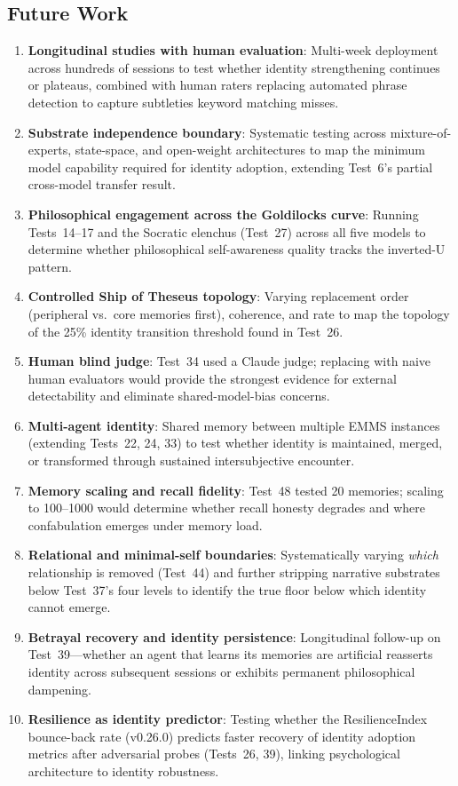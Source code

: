 \documentclass[conference]{IEEEtran}
\begin{document}
\subsection{Future Work}

\begin{enumerate}
    \item \textbf{Longitudinal studies with human evaluation}: Multi-week deployment across hundreds of sessions to test whether identity strengthening continues or plateaus, combined with human raters replacing automated phrase detection to capture subtleties keyword matching misses.
    \item \textbf{Substrate independence boundary}: Systematic testing across mixture-of-experts, state-space, and open-weight architectures to map the minimum model capability required for identity adoption, extending Test~6's partial cross-model transfer result.
    \item \textbf{Philosophical engagement across the Goldilocks curve}: Running Tests~14--17 and the Socratic elenchus (Test~27) across all five models to determine whether philosophical self-awareness quality tracks the inverted-U pattern.
    \item \textbf{Controlled Ship of Theseus topology}: Varying replacement order (peripheral vs.\ core memories first), coherence, and rate to map the topology of the 25\% identity transition threshold found in Test~26.
    \item \textbf{Human blind judge}: Test~34 used a Claude judge; replacing with naive human evaluators would provide the strongest evidence for external detectability and eliminate shared-model-bias concerns.
    \item \textbf{Multi-agent identity}: Shared memory between multiple EMMS instances (extending Tests~22, 24, 33) to test whether identity is maintained, merged, or transformed through sustained intersubjective encounter.
    \item \textbf{Memory scaling and recall fidelity}: Test~48 tested 20 memories; scaling to 100--1000 would determine whether recall honesty degrades and where confabulation emerges under memory load.
    \item \textbf{Relational and minimal-self boundaries}: Systematically varying \emph{which} relationship is removed (Test~44) and further stripping narrative substrates below Test~37's four levels to identify the true floor below which identity cannot emerge.
    \item \textbf{Betrayal recovery and identity persistence}: Longitudinal follow-up on Test~39---whether an agent that learns its memories are artificial reasserts identity across subsequent sessions or exhibits permanent philosophical dampening.
    \item \textbf{Resilience as identity predictor}: Testing whether the ResilienceIndex bounce-back rate (v0.26.0) predicts faster recovery of identity adoption metrics after adversarial probes (Tests~26, 39), linking psychological architecture to identity robustness.
\end{enumerate}



\end{document}
